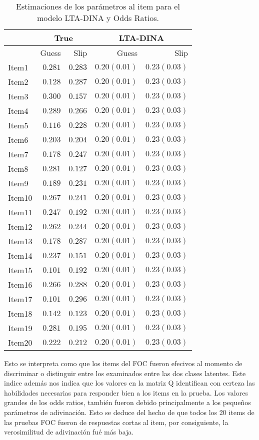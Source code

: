 \begin{table}[H]
	\centering
	\caption{Estimaciones de los par\'{a}metros al item para el modelo LTA-DINA y Odds Ratios.}
	\begin{tabular}{lrrrr}
		\hline
		& \multicolumn{2}{c}{True} & \multicolumn{2}{c}{LTA-DINA}\\
		\hline
		& Guess & Slip & Guess & Slip\\
		\hline
		Item1 & $0.281$ & $0.283$ & $0.20(0.01)$ & $0.23(0.03)$ \\
		Item2 & $0.128$ & $0.287$ & $0.20(0.01)$ & $0.23(0.03)$ \\
		Item3 & $0.300$ & $0.157$ & $0.20(0.01)$ & $0.23(0.03)$ \\
		Item4 & $0.289$ & $0.266$ & $0.20(0.01)$ & $0.23(0.03)$ \\
		Item5 & $0.116$ & $0.228$ & $0.20(0.01)$ & $0.23(0.03)$\\
		Item6 & $0.203$ & $0.204$ & $0.20(0.01)$ & $0.23(0.03)$ \\
		Item7 & $0.178$ & $0.247$ & $0.20(0.01)$ & $0.23(0.03)$ \\
		Item8 & $0.281$ & $0.127$ & $0.20(0.01)$ & $0.23(0.03)$ \\
		Item9 & $0.189$ & $0.231$ & $0.20(0.01)$ & $0.23(0.03)$\\
		Item10 & $0.267$ & $0.241$ & $0.20(0.01)$ & $0.23(0.03)$ \\
		Item11 & $0.247$ & $0.192$ & $0.20(0.01)$ & $0.23(0.03)$ \\
		Item12 & $0.262$ & $0.244$ & $0.20(0.01)$ & $0.23(0.03)$ \\
		Item13 & $0.178$ & $0.287$ & $0.20(0.01)$ & $0.23(0.03)$ \\
		Item14 & $0.237$ & $0.151$ & $0.20(0.01)$ & $0.23(0.03)$ \\
		Item15 & $0.101$ & $0.192$ & $0.20(0.01)$ & $0.23(0.03)$ \\
		Item16 & $0.266$ & $0.288$ & $0.20(0.01)$ & $0.23(0.03)$ \\
		Item17 & $0.101$ & $0.296$ & $0.20(0.01)$ & $0.23(0.03)$ \\
		Item18 & $0.142$ & $0.123$ & $0.20(0.01)$ & $0.23(0.03)$ \\
		Item19 & $0.281$ & $0.195$ & $0.20(0.01)$ & $0.23(0.03)$\\
		Item20 & $0.222$ & $0.212$ & $0.20(0.01)$ & $0.23(0.03)$\\
		\hline
	\end{tabular}
\end{table}
Esto se interpreta como que los items del FOC fueron efecivos al momento de discriminar o distinguir entre los examinados entre las dos clases latentes. Este indice además nos indica que los valores en la matriz Q identifican con certeza las habilidades necesarias para responder bien a los items en la prueba. Los valores grandes de los odds ratios, también fueron debido principalmente a los pequeños parámetros de adivinación. Esto se deduce del hecho de que todos los 20 items de las pruebas FOC fueron de respuestas cortas al item, por consiguiente, la verosimilitud de adivinación fué más baja. 

